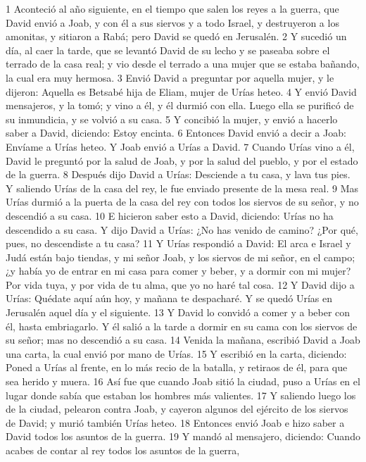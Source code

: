 1 Aconteció al año siguiente, en el tiempo que salen los reyes a la guerra, que David envió a Joab, y con él a sus siervos y a todo Israel, y destruyeron a los amonitas, y sitiaron a Rabá; pero David se quedó en Jerusalén. 
2 Y sucedió un día, al caer la tarde, que se levantó David de su lecho y se paseaba sobre el terrado de la casa real; y vio desde el terrado a una mujer que se estaba bañando, la cual era muy hermosa.
3 Envió David a preguntar por aquella mujer, y le dijeron: Aquella es Betsabé hija de Eliam, mujer de Urías heteo.
4 Y envió David mensajeros, y la tomó; y vino a él, y él durmió con ella. Luego ella se purificó de su inmundicia, y se volvió a su casa.
5 Y concibió la mujer, y envió a hacerlo saber a David, diciendo: Estoy encinta.
6 Entonces David envió a decir a Joab: Envíame a Urías heteo. Y Joab envió a Urías a David.
7 Cuando Urías vino a él, David le preguntó por la salud de Joab, y por la salud del pueblo, y por el estado de la guerra.
8 Después dijo David a Urías: Desciende a tu casa, y lava tus pies. Y saliendo Urías de la casa del rey, le fue enviado presente de la mesa real.
9 Mas Urías durmió a la puerta de la casa del rey con todos los siervos de su señor, y no descendió a su casa.
10 E hicieron saber esto a David, diciendo: Urías no ha descendido a su casa. Y dijo David a Urías: ¿No has venido de camino? ¿Por qué, pues, no descendiste a tu casa?
11 Y Urías respondió a David: El arca e Israel y Judá están bajo tiendas, y mi señor Joab, y los siervos de mi señor, en el campo; ¿y había yo de entrar en mi casa para comer y beber, y a dormir con mi mujer? Por vida tuya, y por vida de tu alma, que yo no haré tal cosa.
12 Y David dijo a Urías: Quédate aquí aún hoy, y mañana te despacharé. Y se quedó Urías en Jerusalén aquel día y el siguiente.
13 Y David lo convidó a comer y a beber con él, hasta embriagarlo. Y él salió a la tarde a dormir en su cama con los siervos de su señor; mas no descendió a su casa.
14 Venida la mañana, escribió David a Joab una carta, la cual envió por mano de Urías.
15 Y escribió en la carta, diciendo: Poned a Urías al frente, en lo más recio de la batalla, y retiraos de él, para que sea herido y muera.
16 Así fue que cuando Joab sitió la ciudad, puso a Urías en el lugar donde sabía que estaban los hombres más valientes.
17 Y saliendo luego los de la ciudad, pelearon contra Joab, y cayeron algunos del ejército de los siervos de David; y murió también Urías heteo.
18 Entonces envió Joab e hizo saber a David todos los asuntos de la guerra.
19 Y mandó al mensajero, diciendo: Cuando acabes de contar al rey todos los asuntos de la guerra,
